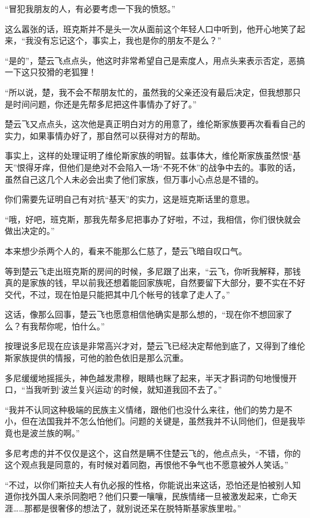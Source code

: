 “冒犯我朋友的人，有必要考虑一下我的愤怒。”

这么嚣张的话，班克斯并不是头一次从面前这个年轻人口中听到，他开心地笑了起来，“我没有忘记这个，事实上，我也是你的朋友不是么？”

“是的”，楚云飞点点头，他这时非常希望自己是索度人，用点头来表示否定，恶搞一下这只狡猾的老狐狸！

“所以说，楚，我不会不帮朋友忙的，虽然我的父亲还没有最后决定，但我想那只是时间问题，你还是先帮多尼把这件事情办了好了。”

楚云飞又点点头，这次他是真正明白对方的用意了，维伦斯家族要再次看看自己的实力，如果事情办好了，那自然可以获得对方的帮助。

事实上，这样的处理证明了维伦斯家族的明智。兹事体大，维伦斯家族虽然恨“基天”恨得牙痒，但他们是绝对不会陷入一场“不死不休”的战争中去的。事败的话，虽然自己这几个人未必会出卖了他们家族，但万事小心点总是不错的。

你们需要先证明自己有对抗“基天”的实力，这是班克斯话里的意思。

“哦，好吧，班克斯，那我先帮多尼把事办了好啦，不过，我相信，你们很快就会做出决定的。”

本来想少杀两个人的，看来不能那么仁慈了，楚云飞暗自叹口气。

等到楚云飞走出班克斯的房间的时候，多尼跟了出来，“云飞，你听我解释，那钱真的是家族的钱，早以前我还想着能回家族呢，自然要留下大部分，要不实在不好交代，不过，现在怕是只能把其中几个帐号的钱拿了走人了。”

这话，像那么回事，楚云飞也愿意相信他确实是那么想的，“现在你不想回家了么？有我帮你呢，怕什么。”

按理说多尼现在应该是非常高兴才对，楚云飞已经决定帮他到底了，又得到了维伦斯家族提供的情报，可他的脸色依旧是那么沉重。

多尼缓缓地摇摇头，神色越发肃穆，眼睛也眯了起来，半天才斟词酌句地慢慢开口，“当我听到‘波兰复兴运动’的时候，就知道我回不去了。”

“我并不认同这种极端的民族主义情绪，跟他们也没什么来往，他们的势力是不小，但在法国我并不怎么怕他们。问题的关键是，虽然我并不认同他们，但是我毕竟也是波兰族的啊。”

多尼考虑的并不仅仅是这个，这自然是瞒不住楚云飞的，他点点头，“不错，你的这个观点我是同意的，有时候对着同胞，再恨他不争气也不愿意被外人笑话。”

“不过，以你们斯拉夫人有仇必报的性格，你能说出来这话，恐怕还是怕被别人知道你找外国人来杀同胞吧？他们只要一嚷嚷，民族情绪一旦被激发起来，亡命天涯……那都是很奢侈的想法了，就别说还呆在脱特斯基家族里啦。”

